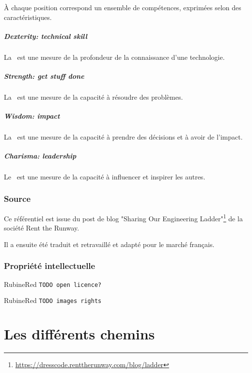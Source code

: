 \documentclass[a4paper, french, openany, 12pt]{book}
\newcommand{\todo}[1]{
  \begin{color}{RubineRed}
    \texttt{TODO {#1}}
  \end{color}
}
\newcommand\dex{\textcolor{BrickRed}{\textbf{\bsc{Dex}}}}
\newcommand\str{\textcolor{DarkOrchid}{\textbf{\bsc{Str}}}}
\newcommand\wis{\textcolor{MidnightBlue}{\textbf{\bsc{Wis}}}}
\newcommand\cha{\textcolor{RawSienna}{\textbf{\bsc{Cha}}}}
\begin{document}
À chaque position correspond un ensemble de compétences, exprimées selon des caractéristiques.

\subsubsection*{Dexterity: technical skill} 

La \dex\ est une mesure de la profondeur de la connaissance d'une technologie.

\subsubsection*{Strength: get stuff done} 

La \str\ est une mesure de la capacité à résoudre des problèmes.

\subsubsection*{Wisdom: impact} 

La \wis\ est une mesure de la capacité à prendre des décisions et à avoir de l'impact.

\subsubsection*{Charisma: leadership} 

Le \cha\ est une mesure de la capacité à influencer et inspirer les autres.

\section*{Source}

Ce référentiel est issue du post de blog 
"Sharing Our Engineering Ladder"\footnote{\url{https://dresscode.renttherunway.com/blog/ladder}}
de la société Rent the Runway.

Il a ensuite été traduit et retravaillé et adapté pour le marché français.

\section*{Propriété intellectuelle}

\todo{open licence?}

\todo{images rights}

\mainmatter

\part{Les différents chemins}
\end{document}
